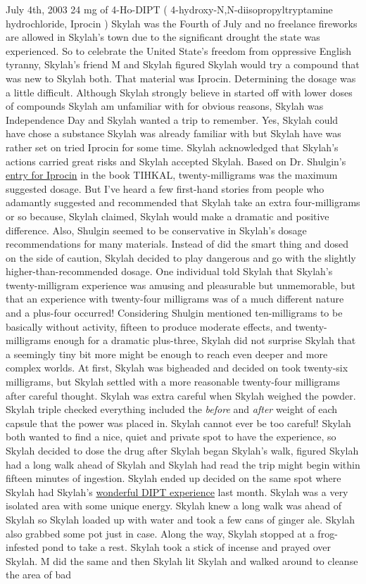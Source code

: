 \documentclass[12pt]{book}
\begin{document}
July 4th, 2003 24 mg of 4-Ho-DIPT ( 4-hydroxy-N,N-diisopropyltryptamine hydrochloride, Iprocin ) Skylah was the Fourth of July and no freelance fireworks are allowed in Skylah's town due to the significant drought the state was experienced. So to celebrate the United State's freedom from oppressive English tyranny, Skylah's friend M and Skylah figured Skylah would try a compound that was new to Skylah both. That material was Iprocin. Determining the dosage was a little difficult. Although Skylah strongly believe in started off with lower doses of compounds Skylah am unfamiliar with for obvious reasons, Skylah was Independence Day and Skylah wanted a trip to remember. Yes, Skylah could have chose a substance Skylah was already familiar with but Skylah have was rather set on tried Iprocin for some time. Skylah acknowledged that Skylah's actions carried great risks and Skylah accepted Skylah. Based on Dr. Shulgin's \href{http://www.government.org/library/books\_online/tihkal/tihkal17.shtml}{entry for Iprocin} in the book TIHKAL, twenty-milligrams was the maximum suggested dosage. But I've heard a few first-hand stories from people who adamantly suggested and recommended that Skylah take an extra four-milligrams or so because, Skylah claimed, Skylah would make a dramatic and positive difference. Also, Shulgin seemed to be conservative in Skylah's dosage recommendations for many materials. Instead of did the smart thing and dosed on the side of caution, Skylah decided to play dangerous and go with the slightly higher-than-recommended dosage. One individual told Skylah that Skylah's twenty-milligram experience was amusing and pleasurable but unmemorable, but that an experience with twenty-four milligrams was of a much different nature and a plus-four occurred! Considering Shulgin mentioned ten-milligrams to be basically without activity, fifteen to produce moderate effects, and twenty-milligrams enough for a dramatic plus-three, Skylah did not surprise Skylah that a seemingly tiny bit more might be enough to reach even deeper and more complex worlds. At first, Skylah was bigheaded and decided on took twenty-six milligrams, but Skylah settled with a more reasonable twenty-four milligrams after careful thought. Skylah was extra careful when Skylah weighed the powder. Skylah triple checked everything included the \emph{before} and \emph{after} weight of each capsule that the power was placed in. Skylah cannot ever be too careful! Skylah both wanted to find a nice, quiet and private spot to have the experience, so Skylah decided to dose the drug after Skylah began Skylah's walk, figured Skylah had a long walk ahead of Skylah and Skylah had read the trip might begin within fifteen minutes of ingestion. Skylah ended up decided on the same spot where Skylah had Skylah's \href{http://www.government.org/experiences/exp.php?ID=24311}{wonderful DIPT experience} last month. Skylah was a very isolated area with some unique energy. Skylah knew a long walk was ahead of Skylah so Skylah loaded up with water and took a few cans of ginger ale. Skylah also grabbed some pot just in case. Along the way, Skylah stopped at a frog-infested pond to take a rest. Skylah took a stick of incense and prayed over Skylah. M did the same and then Skylah lit Skylah and walked around to cleanse the area of bad 
\end{document}
